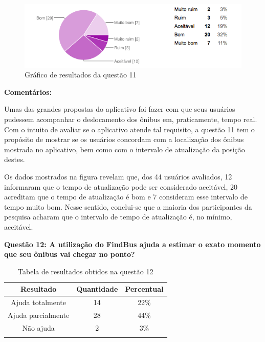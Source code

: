 \begin{figure}[!h]
\begin{center}
  \includegraphics[width=14cm]{images/graficos/questao11.png}
  \caption{Gráfico de resultados da questão 11}
  \label{fig:questao11}
\end{center}
\end{figure}

\textbf{Comentários:}

Umas das grandes propostas do aplicativo foi fazer com que seus usuários pudessem acompanhar o deslocamento dos ônibus em, praticamente, tempo real. Com o intuito de avaliar se o aplicativo atende tal requisito, a questão 11 tem o propósito de mostrar se os usuários concordam com a localização dos ônibus mostrada no aplicativo, bem como com o intervalo de atualização da posição destes. 
	
Os dados mostrados na figura  revelam que, dos 44 usuários avaliados, 12 informaram que o tempo de atualização pode ser considerado aceitável, 20 acreditam que o tempo de atualização é bom e 7 consideram esse intervalo de tempo muito bom. Nesse sentido, conclui-se que a maioria dos participantes da pesquisa acharam que o intervalo de tempo de atualização é, no mínimo, aceitável.\newline

\textbf{Questão 12: A utilização do FindBus ajuda a estimar o exato momento que seu ônibus vai chegar no ponto?}

\begin{center}
\begin{longtable}{c|c|c}
\hline
    \multicolumn{1}{c}{\textbf{Resultado}} & \multicolumn{1}{c}{\textbf{Quantidade}} & \multicolumn{1}{c}{\textbf{Percentual}} \\
\hline
    Ajuda totalmente & 14 &  22\%\\
    \hline
    Ajuda parcialmente & 28 & 44\%\\
    \hline
    Não ajuda & 2 &  3\%\\
    \hline

\caption{Tabela de resultados obtidos na questão 12}
\label{tabq12}
\end{longtable}
\end{center}


